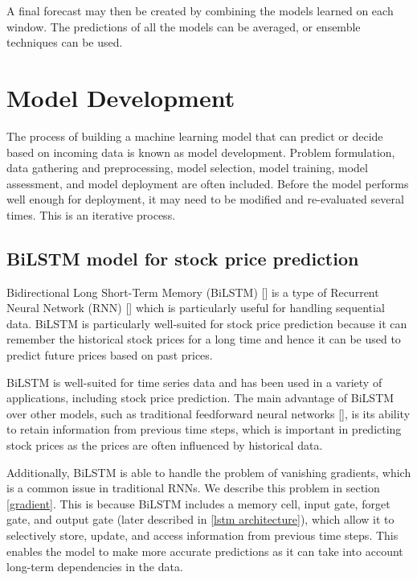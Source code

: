 \documentclass[a4paper]{article}
\begin{document}
A final forecast may then be created by combining the models learned on each window. The predictions of all the models can be averaged, or ensemble techniques can be used.

\section{Model Development}

The process of building a machine learning model that can predict or decide based on incoming data is known as model development. Problem formulation, data gathering and preprocessing, model selection, model training, model assessment, and model deployment are often included. Before the model performs well enough for deployment, it may need to be modified and re-evaluated several times. This is an iterative process.
\subsection{BiLSTM model for stock price prediction}
Bidirectional Long Short-Term Memory (BiLSTM) [\cite{schuster1997bidirectional}] is a type of Recurrent Neural Network (RNN) [\cite{rumelhart1985learning, jordan1997serial}] which is particularly useful for handling sequential data. BiLSTM is particularly well-suited for stock price prediction because it can remember the historical stock prices for a long time and hence it can be used to predict future prices based on past prices.

BiLSTM is well-suited for time series data and has been used in a variety of applications, including stock price prediction. The main advantage of BiLSTM over other models, such as traditional feedforward neural networks [\cite{rosenblatt1958perceptron}], is its ability to retain information from previous time steps, which is important in predicting stock prices as the prices are often influenced by historical data.

Additionally, BiLSTM is able to handle the problem of vanishing gradients, which is a common issue in traditional RNNs. We describe this problem in section \ref{gradient}. This is because BiLSTM includes a memory cell, input gate, forget gate, and output gate (later described in \ref{lstm architecture}), which allow it to selectively store, update, and access information from previous time steps. This enables the model to make more accurate predictions as it can take into account long-term dependencies in the data.
\end{document}
